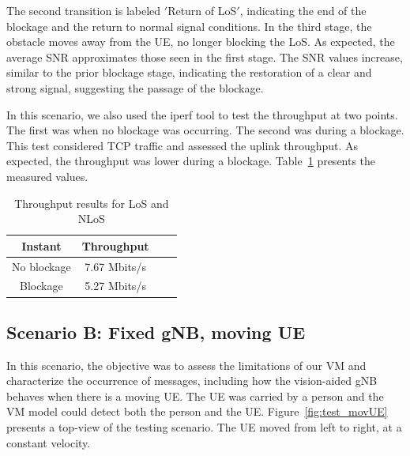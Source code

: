 The second transition is labeled \('\)Return of LoS\('\), indicating the end of the blockage and the return to normal signal conditions.
In the third stage, the obstacle moves away from the UE, no longer blocking the LoS\@.
As expected, the average SNR approximates those seen in the first stage.
The SNR values increase, similar to the prior blockage stage, indicating the restoration of a clear and strong signal, suggesting the passage of the blockage.

In this scenario, we also used the iperf tool to test the throughput at two points.
The first was when no blockage was occurring.
The second was during a blockage.
This test considered TCP traffic and assessed the uplink throughput.
As expected, the throughput was lower during a blockage.
Table~\ref{tab:iperf} presents the measured values.


\begin{table}[h]
    \centering %
    \begin{tabular}{|c|c|c|c|}
        \hline
        \textbf{Instant} & \textbf{Throughput} \\ \hline
        No blockage & 7.67 Mbits/s \\ \hline
        Blockage   &  5.27 Mbits/s \\ \hline
    \end{tabular}
    \caption{Throughput results for LoS and NLoS} %
    \label{tab:iperf} %
\end{table}


\subsection{Scenario B: Fixed gNB, moving UE}\label{subsec:scenario-0.1:-fixed-gnb-moving-ue}

In this scenario, the objective was to assess the limitations of our VM and characterize the occurrence of messages, including how the vision-aided gNB behaves when there is a moving UE\@.
The UE was carried by a person and the VM model could detect both the person and the UE\@.
Figure~\ref{fig:test_movUE} presents a top-view of the testing scenario.
The UE moved from left to right, at a constant velocity.

